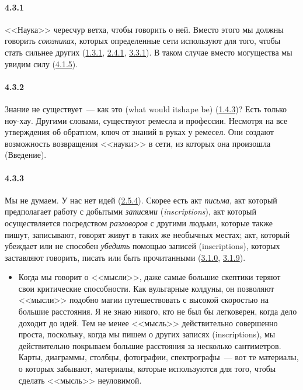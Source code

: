 \paragraph{4.3.1}\hypertarget{par:4.3.1}{} <<Наука>> чересчур ветха, чтобы говорить о ней. Вместо этого мы должны говорить {\itshape союзниках}, которых определенные сети используют для того, чтобы стать сильнее других (\hyperlink{par:1.3.1}{1.3.1}, \hyperlink{par:2.4.1}{2.4.1}, \hyperlink{par:3.3.1}{3.3.1}). В таком случае вместо могущества мы увидим силу (\hyperlink{par:4.1.5}{4.1.5}).


\paragraph{4.3.2}\hypertarget{par:4.3.2}{} Знание не существует~--- как это (what would itshape be) (\hyperlink{par:1.4.3}{1.4.3})? Есть только ноу-хау. Другими словами, существуют ремесла и профессии. Несмотря на все утверждения об обратном, ключ от знаний в руках у ремесел. Они создают возможность возвращения <<науки>> в сети, из которых она произошла (Введение).


\paragraph{4.3.3}\hypertarget{par:4.3.3}{} Мы не думаем. У нас нет идей (\hyperlink{par:2.5.4}{2.5.4}). Скорее есть акт {\itshape письма}, акт который предполагает работу с добытыми {\itshape записями} ({\itshape inscriptions}), акт который осуществляется посредством {\itshape разговоров} с другими людьми, которые также пишут, записывают, говорят живут в таких же необычных местах; акт, который убеждает или не способен {\itshape убедить} помощью записей (inscriptions), которых заставляют говорить, писать или быть прочитанными (\hyperlink{par:3.1.0}{3.1.0}, \hyperlink{par:3.1.9}{3.1.9}). 
	\begin{itemize}
	\item 
	Когда мы говорит о <<мысли>>, даже самые большие скептики теряют свои критические способности. Как вульгарные колдуны, он позволяют <<мысли>> подобно магии путешествовать с высокой скоростью на большие расстояния. Я не знаю никого, кто не был бы легковерен, когда дело доходит до идей. Тем не менее <<мысль>> действительно совершенно проста, поскольку, когда мы пишем о других записях (inscriptions), мы действительно покрываем большие расстояния за несколько сантиметров. Карты, диаграммы, столбцы, фотографии, спектрографы~--- вот те материалы, о которых забывают, материалы, которые используются для того, чтобы сделать <<мысль>> неуловимой.
	\end{itemize}


